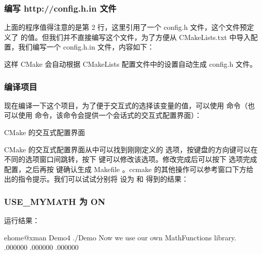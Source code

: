\documentclass[a4paper,12pt,english]{sphinxmanual}
\begin{document}
\subsubsection{编写 http://config.h.in 文件}
\label{\detokenize{dev-board/cmake:http-config-h-in}}
\sphinxAtStartPar
上面的程序值得注意的是第 2 行，这里引用了一个 config.h 文件，这个文件预定义了  的值。但我们并不直接编写这个文件，为了方便从 CMakeLists.txt 中导入配置，我们编写一个 config.h.in 文件，内容如下：

\begin{sphinxVerbatim}[commandchars=\\\{\}]
\end{sphinxVerbatim}

\sphinxAtStartPar
这样 CMake 会自动根据 CMakeLists 配置文件中的设置自动生成 config.h 文件。


\subsubsection{编译项目}
\label{\detokenize{dev-board/cmake:id7}}
\sphinxAtStartPar
现在编译一下这个项目，为了便于交互式的选择该变量的值，可以使用  命令（也可以使用  命令，该命令会提供一个会话式的交互式配置界面）：

\sphinxAtStartPar


\sphinxAtStartPar
CMake 的交互式配置界面

\sphinxAtStartPar
CMake 的交互式配置界面从中可以找到刚刚定义的  选项，按键盘的方向键可以在不同的选项窗口间跳转，按下  键可以修改该选项。修改完成后可以按下  选项完成配置，之后再按  键确认生成 Makefile 。ccmake 的其他操作可以参考窗口下方给出的指令提示。我们可以试试分别将  设为  和  得到的结果：


\subsubsection{USE\_MYMATH 为 ON}
\label{\detokenize{dev-board/cmake:use-mymath-on}}
\sphinxAtStartPar
运行结果：

\begin{sphinxVerbatim}[commandchars=\\\{\}]
\PYG{o}{[}ehome@xman Demo4\PYG{o}{]}\PYGZdl{} ./Demo
Now we use our own MathFunctions library.
  \PYGZca{}   .000000
  \PYGZca{}   .000000
  \PYGZca{}   .000000
\end{sphinxVerbatim}
\end{document}
